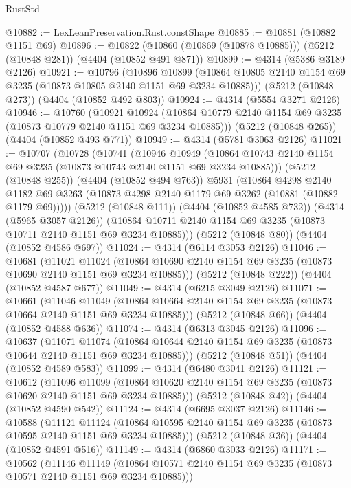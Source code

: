 \begin{lexlean}{RustStd}
\begin{coremodule}
@10882 := LexLeanPreservation.Rust.constShape
@10885 := @10881 (@10882 @1151 @69)
@10896 := @10822 (@10860 (@10869 (@10878 @10885))) (@5212 (@10848 @281)) (@4404 (@10852 @491 @871))
@10899 := @4314 (@5386 @3189 @2126)
@10921 := @10796
    (@10896
      @10899
      (@10864 @10805 @2140 @1154 @69 @3235 (@10873 @10805 @2140 @1151 @69 @3234 @10885)))
    (@5212 (@10848 @273))
    (@4404 (@10852 @492 @803))
@10924 := @4314 (@5554 @3271 @2126)
@10946 := @10760
    (@10921
      @10924
      (@10864 @10779 @2140 @1154 @69 @3235 (@10873 @10779 @2140 @1151 @69 @3234 @10885)))
    (@5212 (@10848 @265))
    (@4404 (@10852 @493 @771))
@10949 := @4314 (@5781 @3063 @2126)
@11021 := @10707
    (@10728
      (@10741
        (@10946
          @10949
          (@10864 @10743 @2140 @1154 @69 @3235 (@10873 @10743 @2140 @1151 @69 @3234 @10885)))
        (@5212 (@10848 @255))
        (@4404 (@10852 @494 @763))
        @5931
        (@10864
          @4298
          @2140
          @1182
          @69
          @3263
          (@10873 @4298 @2140 @1179 @69 @3262 (@10881 (@10882 @1179 @69)))))
      (@5212 (@10848 @111))
      (@4404 (@10852 @4585 @732))
      (@4314 (@5965 @3057 @2126))
      (@10864 @10711 @2140 @1154 @69 @3235 (@10873 @10711 @2140 @1151 @69 @3234 @10885)))
    (@5212 (@10848 @80))
    (@4404 (@10852 @4586 @697))
@11024 := @4314 (@6114 @3053 @2126)
@11046 := @10681
    (@11021
      @11024
      (@10864 @10690 @2140 @1154 @69 @3235 (@10873 @10690 @2140 @1151 @69 @3234 @10885)))
    (@5212 (@10848 @222))
    (@4404 (@10852 @4587 @677))
@11049 := @4314 (@6215 @3049 @2126)
@11071 := @10661
    (@11046
      @11049
      (@10864 @10664 @2140 @1154 @69 @3235 (@10873 @10664 @2140 @1151 @69 @3234 @10885)))
    (@5212 (@10848 @66))
    (@4404 (@10852 @4588 @636))
@11074 := @4314 (@6313 @3045 @2126)
@11096 := @10637
    (@11071
      @11074
      (@10864 @10644 @2140 @1154 @69 @3235 (@10873 @10644 @2140 @1151 @69 @3234 @10885)))
    (@5212 (@10848 @51))
    (@4404 (@10852 @4589 @583))
@11099 := @4314 (@6480 @3041 @2126)
@11121 := @10612
    (@11096
      @11099
      (@10864 @10620 @2140 @1154 @69 @3235 (@10873 @10620 @2140 @1151 @69 @3234 @10885)))
    (@5212 (@10848 @42))
    (@4404 (@10852 @4590 @542))
@11124 := @4314 (@6695 @3037 @2126)
@11146 := @10588
    (@11121
      @11124
      (@10864 @10595 @2140 @1154 @69 @3235 (@10873 @10595 @2140 @1151 @69 @3234 @10885)))
    (@5212 (@10848 @36))
    (@4404 (@10852 @4591 @516))
@11149 := @4314 (@6860 @3033 @2126)
@11171 := @10562
    (@11146
      @11149
      (@10864 @10571 @2140 @1154 @69 @3235 (@10873 @10571 @2140 @1151 @69 @3234 @10885)))

\end{coremodule}
\end{lexlean}
